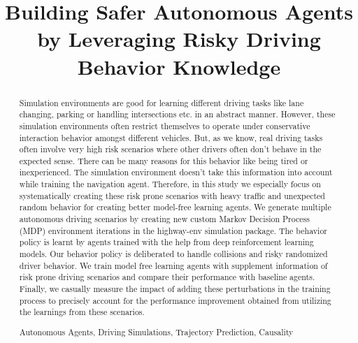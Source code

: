 \documentclass[a4, conference]{IEEEtran}
\begin{document}
	\title{Building Safer Autonomous Agents by Leveraging Risky Driving Behavior Knowledge}


	\author{
		\and
	}

\maketitle

\begin{abstract}

	Simulation environments are good for learning different driving tasks like lane changing, parking or handling intersections etc. in an abstract manner. However, these simulation environments often restrict themselves to operate under conservative interaction behavior amongst different vehicles. But, as we know, real driving tasks often involve very high risk scenarios where other drivers often don't behave in the expected sense. There can be many reasons for this behavior like being tired or inexperienced. The simulation environment doesn't take this information into account while training the navigation agent. Therefore, in this study we especially focus on systematically creating these risk prone scenarios with heavy traffic and unexpected random behavior for creating better model-free learning agents. We generate multiple autonomous driving scenarios by creating new custom Markov Decision Process (MDP) environment iterations in the highway-env simulation package. The behavior policy is learnt by agents trained with the help from deep reinforcement learning models. Our behavior policy is deliberated to handle collisions and risky randomized driver behavior. We train model free learning agents with supplement information of risk prone driving scenarios and compare their performance with baseline agents. Finally, we casually measure the impact of adding these perturbations in the training process to precisely account for the performance improvement obtained from utilizing the learnings from these scenarios.


	\begin{IEEEkeywords}
		Autonomous Agents, Driving Simulations, Trajectory Prediction, Causality
	\end{IEEEkeywords}


\end{abstract}
\end{document}
